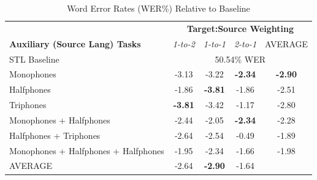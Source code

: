 \documentclass[a4paper]{article}
\begin{document}
\begin{table}[!htbp]
  \centering
  \caption{Word Error Rates (WER\%) Relative to Baseline}
    \label{tab:results}
  \begin{adjustbox}{width=.45\textwidth}
    \begin{tabular}{lcccc}
      \toprule
      & \multicolumn{4}{c}{\textbf{Target:Source Weighting}} \\
      \textbf{Auxiliary (Source Lang) Tasks} & \textit{1-to-2} & \textit{1-to-1} & \textit{2-to-1} & AVERAGE\\
      \midrule
      STL Baseline                          &  \multicolumn{4}{c}{50.54\% WER}  \\
      Monophones                            &  -3.13  & -3.22 & \textbf{-2.34}  & \textbf{-2.90}\\
      Halfphones                            &  -1.86  & \textbf{-3.81} & -1.86 & -2.51\\
      Triphones                             &  \textbf{-3.81} & -3.42 & -1.17  & -2.80\\
      Monophones + Halfphones               &  -2.44  & -2.05 &  \textbf{-2.34}& -2.28\\
      Halfphones + Triphones                &  -2.64  & -2.54 & -0.49 & -1.89\\
      Monophones + Halfphones + Halfphones  &  -1.95  & -2.34 &  -1.66& -1.98\\
      \midrule
      AVERAGE                               &  -2.64  & \textbf{-2.90} & -1.64 & \\
      \bottomrule
    \end{tabular}
  \end{adjustbox}
\end{table}
\end{document}

